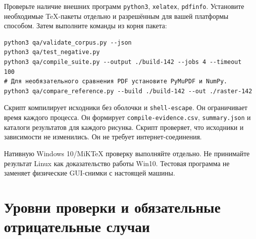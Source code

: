 \documentclass[11pt,a4paper,oneside]{scrreprt}
\begin{document}
Проверьте наличие внешних программ \texttt{python3}, \texttt{xelatex}, \texttt{pdfinfo}. Установите необходимые TeX-пакеты отдельно и разрешённым для вашей платформы способом. Затем выполните команды из корня пакета:

\begin{verbatim}
python3 qa/validate_corpus.py --json
python3 qa/test_negative.py
python3 qa/compile_suite.py --output ./build-142 --jobs 4 --timeout 100
# Для необязательного сравнения PDF установите PyMuPDF и NumPy.
python3 qa/compare_reference.py --build ./build-142 --out ./raster-142
\end{verbatim}

Скрипт компилирует исходники без оболочки и \texttt{shell-escape}. Он ограничивает время каждого процесса. Он формирует \texttt{compile-evidence.csv}, \texttt{summary.json} и каталоги результатов для каждого рисунка. Скрипт проверяет, что исходники и зависимости не изменились. Он не требует интернет-соединения.

Нативную Windows 10/MiKTeX проверку выполняйте отдельно. Не принимайте результат Linux как доказательство работы Win10. Тестовая программа не заменяет физические GUI-снимки с настоящей машины.

\section{Уровни проверки и обязательные отрицательные случаи}\label{ux443ux440ux43eux432ux43dux438-ux43fux440ux43eux432ux435ux440ux43aux438-ux438-ux43eux431ux44fux437ux430ux442ux435ux43bux44cux43dux44bux435-ux43eux442ux440ux438ux446ux430ux442ux435ux43bux44cux43dux44bux435-ux441ux43bux443ux447ux430ux438}
\end{document}
